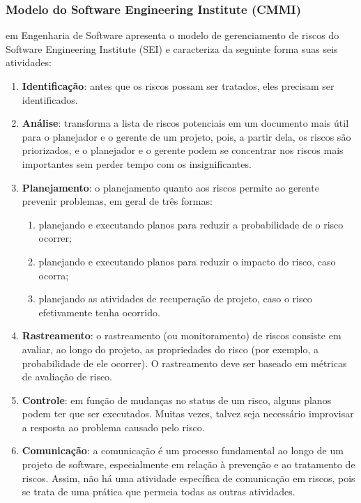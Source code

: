 \documentclass[
	12pt,
	openright,
	twoside,
	a4paper,
	english,
	brazil
	]{abntex2}
\begin{document}

\subsubsection{Modelo do Software Engineering Institute (CMMI)}

 em Engenharia de Software apresenta o modelo de gerenciamento de riscos do Software Engineering Institute (SEI) e caracteriza da seguinte forma suas seis atividades:

\begin{enumerate}
  \item \textbf{Identificação}: antes que os riscos possam ser tratados, eles precisam ser identificados.
  \item \textbf{Análise}: transforma a lista de riscos potenciais em um documento mais útil para o planejador e o gerente de um projeto, pois, a partir dela, os riscos são priorizados, e o planejador e o gerente podem se concentrar nos riscos mais importantes sem perder tempo com os insignificantes.
  \item \textbf{Planejamento}: o planejamento quanto aos riscos permite ao gerente prevenir problemas, em geral de três formas:
  \begin{enumerate}
    \item planejando e executando planos para reduzir a probabilidade de o risco ocorrer;
    \item planejando e executando planos para reduzir o impacto do risco, caso ocorra;
    \item planejando as atividades de recuperação de projeto, caso o risco efetivamente tenha ocorrido.
  \end{enumerate}
  \item \textbf{Rastreamento}: o rastreamento (ou monitoramento) de riscos consiste em avaliar, ao longo do projeto, as propriedades do risco (por exemplo, a probabilidade de ele ocorrer). O rastreamento deve ser baseado em métricas de avaliação de risco.
  \item \textbf{Controle}: em função de mudanças no status de um risco, alguns planos podem ter que ser executados. Muitas vezes, talvez seja necessário improvisar a resposta ao problema causado pelo risco.
  \item \textbf{Comunicação}: a comunicação é um processo fundamental ao longo de um projeto de software, especialmente em relação à prevenção e ao tratamento de riscos. Assim, não há uma atividade específica de comunicação em riscos, pois se trata de uma prática que permeia todas as outras atividades.
\end{enumerate}
\end{document}
